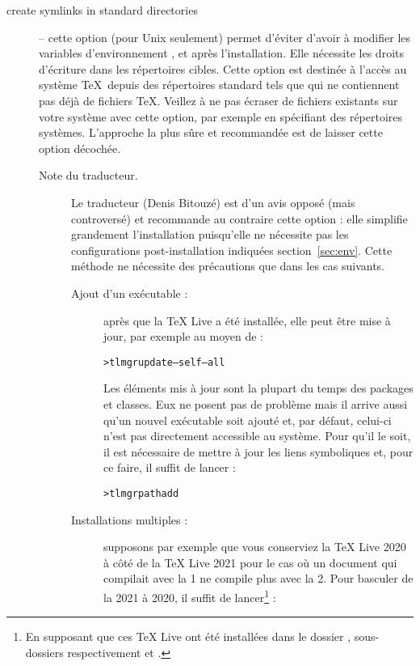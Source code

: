\documentclass[german, english, french]{article}
\renewcommand{\TL}{\TeX{} Live\xspace}%
\begin{document}
\begin{description}
\item[create symlinks in standard directories] -- cette option (pour Unix
  seulement) permet d'éviter d'avoir à modifier les variables d'environnement
  ,  et  après
  l'installation. Elle nécessite les droits d'écriture dans les répertoires
  cibles. Cette option est destinée à l'accès au système \TeX\ depuis des
  répertoires standard tels que  qui ne contiennent pas
  déjà de fichiers \TeX. Veillez à ne pas écraser de fichiers existants sur
  votre système avec cette option, par exemple en spécifiant des répertoires
  systèmes. L'approche la plus sûre et recommandée est de laisser cette option
  décochée.
  \begin{description}
  \item[Note du traducteur.] Le traducteur (Denis Bitouzé) est d'un avis
    opposé (mais controversé) et recommande au contraire cette option : elle
    simplifie grandement l'installation puisqu'elle ne nécessite pas les
    configurations post-installation indiquées section~\ref{sec:env}. Cette
    méthode ne nécessite des précautions que dans les cas suivants.
    \begin{description}
    \item[Ajout d'un exécutable :] après que la \TL{} a été installée, elle peut
      être mise à jour, par exemple au moyen de :
\begin{alltt}
> tlmgr update --self --all
\end{alltt}
      Les éléments mis à jour sont la plupart du temps des packages et
      classes. Eux ne posent pas de problème mais il arrive aussi qu'un nouvel
      exécutable soit ajouté et, par défaut, celui-ci n'est pas directement
      accessible au système. Pour qu'il le soit, il est nécessaire de mettre
      à jour les liens symboliques et, pour ce faire, il suffit de lancer :
\begin{alltt}
> tlmgr path add
\end{alltt}
    \item[Installations multiples :] supposons par exemple que vous conserviez
      la \TL{} 2020 à côté de la \TL{} 2021 pour le cas où un document qui
      compilait avec la 1\iere{} ne compile plus avec la 2\ieme{}. Pour basculer
      de la 2021 à 2020, il suffit de lancer\footnote{En supposant que
        ces \TL{} ont été installées dans le dossier
        , sous-dossiers respectivement
         et .} :
\begin{alltt}

\end{alltt}
\end{description}
\end{description}
\end{description}
\end{document}
